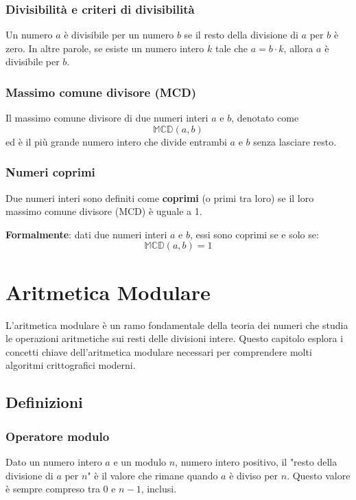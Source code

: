 \documentclass[a4paper,12pt]{report}
\begin{document}
\subsection*{Divisibilità e criteri di divisibilità}

Un numero \(a\) è divisibile per un numero \(b\) se il resto della divisione di \(a\) per \(b\) è zero. In altre parole, se esiste un numero intero \(k\) tale che \(a = b \cdot k\), allora \(a\) è divisibile per \(b\).

\subsection*{Massimo comune divisore (MCD)}
Il massimo comune divisore di due numeri interi \( a \) e \( b \), denotato come 
\[ \mathbb{MCD}(a, b) \] 
ed è il più grande numero intero che divide entrambi \( a \) e \( b \) senza lasciare resto.

\subsection*{Numeri coprimi}
Due numeri interi sono definiti come \textbf{coprimi} (o primi tra loro) se il loro massimo comune divisore (MCD) è uguale a 1. 

\textbf{Formalmente}: dati due numeri interi \(a\) e \(b\), essi sono coprimi se e solo se:
\[\mathbb{MCD}(a, b) = 1\]

\chapter{Aritmetica Modulare}

L'aritmetica modulare è un ramo fondamentale della teoria dei numeri che studia le operazioni aritmetiche sui resti delle divisioni intere. Questo capitolo esplora i concetti chiave dell'aritmetica modulare necessari per comprendere molti algoritmi crittografici moderni.

\section{Definizioni} 
\subsection*{Operatore modulo} Dato un numero intero $a$ e un modulo $n$, numero intero positivo, il "resto della divisione di $a$ per $n$" è il valore che rimane quando $a$ è diviso per $n$. Questo valore è sempre compreso tra 0 e $n-1$, inclusi.
\end{document}
